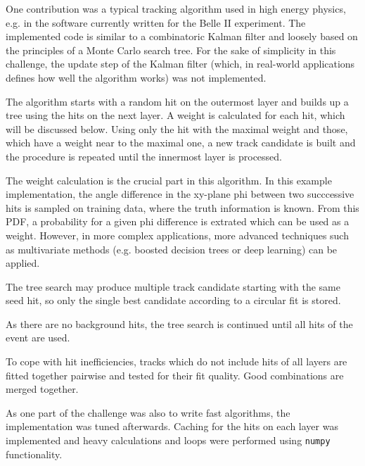 One contribution was a typical tracking algorithm used in high energy physics, e.g. in the software currently written for the Belle II experiment. 
The implemented code is similar to a combinatoric Kalman filter and loosely based on the principles of a Monte Carlo search tree. 
For the sake of simplicity in this challenge, the update step of the Kalman filter (which, in real-world applications defines how well the algorithm works) was not implemented.

The algorithm starts with a random hit on the outermost layer and builds up a tree using the hits on the next layer. A weight is calculated for each hit, which will be discussed below. Using only the hit with the maximal weight and those, which have a weight near to the maximal one, a new track candidate is built and the procedure is repeated until the innermost layer is processed. 

The weight calculation is the crucial part in this algorithm. 
In this example implementation, the angle difference in the xy-plane phi between two succcessive hits is sampled on training data, where the truth information is known. 
From this PDF, a probability for a given phi difference is extrated which can be used as a weight. However, in more complex applications, more advanced techniques such as multivariate methods (e.g. boosted decision trees or deep learning) can be applied.

The tree search may produce multiple track candidate starting with the same seed hit, so only the single best candidate according to a circular fit is stored.

As there are no background hits, the tree search is continued until all hits of the event are used.

To cope with hit inefficiencies, tracks which do not include hits of all layers are fitted together pairwise and tested for their fit quality. Good combinations are merged together.

As one part of the challenge was also to write fast algorithms, the implementation was tuned afterwards. 
Caching for the hits on each layer was implemented and heavy calculations and loops were performed using \texttt{numpy} functionality.
